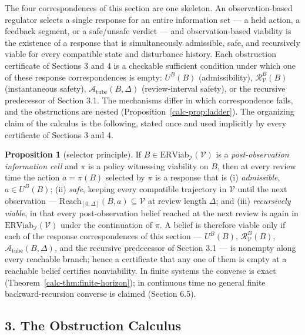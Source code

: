 \documentclass[10pt,twocolumn]{article}
\theoremstyle{definition}
\newtheorem{proposition}{Proposition}
\begin{document}
The four correspondences of this section are one skeleton. An
observation-based regulator selects a single response for an entire
information set --- a held action, a feedback segment, or a
safe/unsafe verdict --- and observation-based viability is the existence
of a response that is simultaneously admissible, safe, and recursively
viable for every compatible state and disturbance history. Each
obstruction certificate of Sections 3 and 4 is a checkable sufficient
condition under which one of these response correspondences is empty:
\(U^B(B)\) (admissibility), \(\mathcal{R}_{\mathcal{V}}^B(B)\)
(instantaneous safety), \(\mathcal{A}_{\mathrm{tube}}(B,\Delta)\)
(review-interval safety), or the recursive predecessor of Section 3.1.
The mechanisms differ in which correspondence fails, and the
obstructions are nested (Proposition~\ref{calc-prop:ladder}). The organizing
claim of the calculus is the following, stated once and used implicitly
by every certificate of Sections 3 and 4.

\begin{proposition}[selector principle]\label{calc-prop:selector}
If \(B\in\mathrm{ERViab}_{\mathcal{I}}(\mathcal{V})\) is a \emph{post-observation information cell} and \(\pi\) is a
policy witnessing viability on \(B\), then at every review time the
action \(a=\pi(B)\) selected by \(\pi\) is a response that is
(i) \emph{admissible}, \(a\in U^B(B)\); (ii) \emph{safe}, keeping every
compatible trajectory in \(\mathcal{V}\) until the next observation ---
\(\mathrm{Reach}_{[0,\Delta]}(B,a)\subseteq\mathcal{V}\) at review
length \(\Delta\); and (iii) \emph{recursively viable}, in that every
post-observation belief reached at the next review is again in
\(\mathrm{ERViab}_{\mathcal{I}}(\mathcal{V})\) under the continuation
of \(\pi\). A belief is therefore viable only if each of the response
correspondences of this section --- \(U^B(B)\),
\(\mathcal{R}_{\mathcal{V}}^B(B)\), \(\mathcal{A}_{\mathrm{tube}}(B,\Delta)\),
and the recursive predecessor of Section 3.1 --- is nonempty along
every reachable branch; hence a certificate that any one of them is
empty at a reachable belief certifies nonviability. In finite systems
the converse is exact (Theorem~\ref{calc-thm:finite-horizon}); in continuous time no general finite backward-recursion converse is
claimed (Section 6.5).
\end{proposition}



\subsection{3. The Obstruction Calculus}\label{calc-the-obstruction-calculus}
\end{document}
